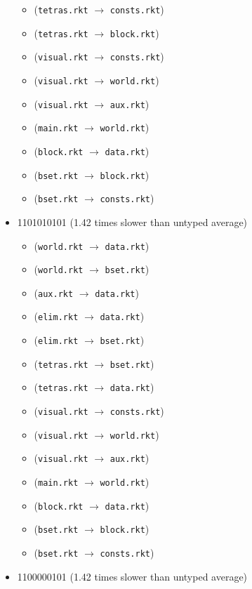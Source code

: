 \documentclass{article}
\newcommand{\mono}[1]{\texttt{#1}}
\begin{document}
\begin{itemize}
\begin{itemize}
  \item (\mono{tetras.rkt} $\rightarrow$ \mono{consts.rkt})
  \item (\mono{tetras.rkt} $\rightarrow$ \mono{block.rkt})
  \item (\mono{visual.rkt} $\rightarrow$ \mono{consts.rkt})
  \item (\mono{visual.rkt} $\rightarrow$ \mono{world.rkt})
  \item (\mono{visual.rkt} $\rightarrow$ \mono{aux.rkt})
  \item (\mono{main.rkt} $\rightarrow$ \mono{world.rkt})
  \item (\mono{block.rkt} $\rightarrow$ \mono{data.rkt})
  \item (\mono{bset.rkt} $\rightarrow$ \mono{block.rkt})
  \item (\mono{bset.rkt} $\rightarrow$ \mono{consts.rkt})
  \end{itemize}
\item 1101010101 (1.42 times slower than untyped average)
  \begin{itemize}
  \item (\mono{world.rkt} $\rightarrow$ \mono{data.rkt})
  \item (\mono{world.rkt} $\rightarrow$ \mono{bset.rkt})
  \item (\mono{aux.rkt} $\rightarrow$ \mono{data.rkt})
  \item (\mono{elim.rkt} $\rightarrow$ \mono{data.rkt})
  \item (\mono{elim.rkt} $\rightarrow$ \mono{bset.rkt})
  \item (\mono{tetras.rkt} $\rightarrow$ \mono{bset.rkt})
  \item (\mono{tetras.rkt} $\rightarrow$ \mono{data.rkt})
  \item (\mono{visual.rkt} $\rightarrow$ \mono{consts.rkt})
  \item (\mono{visual.rkt} $\rightarrow$ \mono{world.rkt})
  \item (\mono{visual.rkt} $\rightarrow$ \mono{aux.rkt})
  \item (\mono{main.rkt} $\rightarrow$ \mono{world.rkt})
  \item (\mono{block.rkt} $\rightarrow$ \mono{data.rkt})
  \item (\mono{bset.rkt} $\rightarrow$ \mono{block.rkt})
  \item (\mono{bset.rkt} $\rightarrow$ \mono{consts.rkt})
  \end{itemize}
\item 1100000101 (1.42 times slower than untyped average)

\end{itemize}
\end{document}
